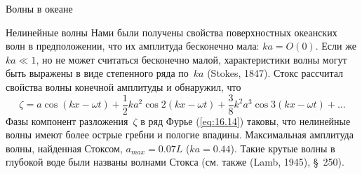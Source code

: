 \begin{chapter}{Волны в океане}
\begin{section}{Нелинейные волны}
Нами были получены свойства поверхностных океанских 
волн в предположении, что их амплитуда бесконечно мала: $ka = O(0)$. 
Если же $ka \ll 1$, но не может считаться бесконечно малой, характеристики
волны могут быть выражены в виде степенного ряда по~$ka$ (Stokes, 1847). 
Стокс рассчитал свойства волны конечной амплитуды и обнаружил, что
\begin{equation}\label{eq:16.14}
 \zeta = a \cos(kx - \omega t) + \frac{1}{2} k a^{2}\cos 2(kx-\omega t) 
         + \frac{3}{8} k^{2} a^{3} \cos 3(k x - \omega t) + \ldots
\end{equation}
Фазы компонент разложения~$\zeta$ в ряд Фурье (\ref{eq:16.14}) таковы, 
что нелинейные волны имеют более острые гребни и пологие впадины.
Максимальная амплитуда волны, найденная Стоксом, $a_{max} = 0.07 L$ 
($ ka = 0.44$). Такие крутые волны в глубокой воде были названы волнами
Стокса (см. также (Lamb, 1945), \S~250).
%


\end{section}
\end{chapter}
